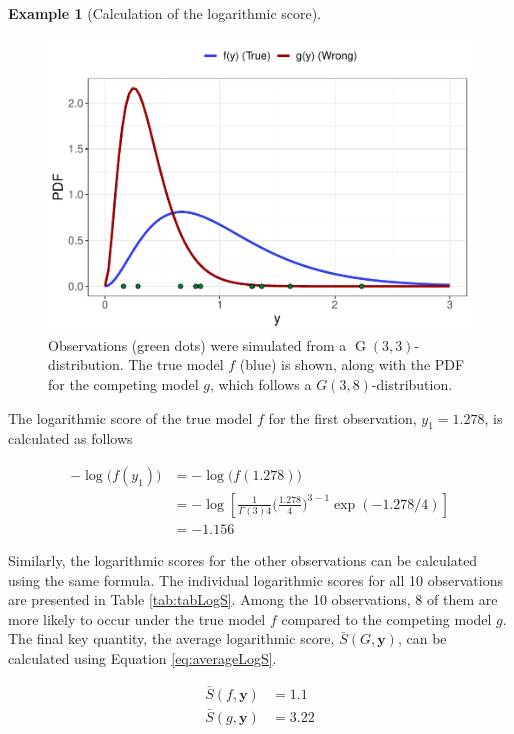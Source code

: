 \documentclass[a4paper,twoside,11pt]{report} %
\DeclareMathOperator{\G}{G}
\theoremstyle{definition}
\theoremstyle{definition}
\newtheorem{example}{Example}[chapter]
\theoremstyle{definition}
\theoremstyle{definition}
\theoremstyle{remark}
\begin{document}
\begin{example}[Calculation of the logarithmic score]
\begin{figure}[H]
\includegraphics[width=1\linewidth]{_main_files/figure-latex/LogSExamplePlot-1} \caption{Observations (green dots) were simulated from a \(\G(3,3)\)-distribution. The true model \(f\) (blue) is shown, along with the PDF for the competing model \(g\), which follows a \(G(3,8)\)-distribution.}\label{fig:LogSExamplePlot}
\end{figure}

The logarithmic score of the true model \(f\) for the first observation, \(y_1=1.278\), is calculated as follows

\begin{equation}
  \begin{aligned}
  -\log\big(f(y_1)\big)&=-\log\big(f(1.278)\big) \\
  &=-\log\left[ \frac{1}{\Gamma(3)4}\Big(\frac{1.278}{4}\Big)^{3-1}\exp(-1.278/4)\right] \\
  &=-1.156
  \end{aligned}
\end{equation}

Similarly, the logarithmic scores for the other observations can be calculated using the same formula. The individual logarithmic scores for all 10 observations are presented in Table \ref{tab:tabLogS}. Among the 10 observations, 8 of them are more likely to occur under the true model \(f\) compared to the competing model \(g\). The final key quantity, the average logarithmic score, \(\bar{S}(G,\boldsymbol y)\), can be calculated using Equation \eqref{eq:averageLogS}.

\begin{equation}
  \begin{aligned}
    \bar{S}(f,\boldsymbol y) &=1.1 \\
    \bar{S}(g,\boldsymbol y) &=3.22
  \end{aligned}
\end{equation}


\end{example}
\end{document}
